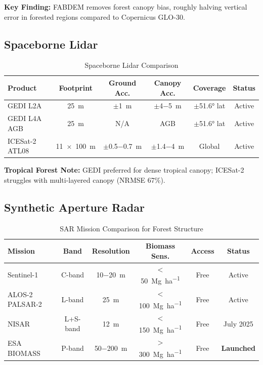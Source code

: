 \documentclass[11pt,letterpaper]{article}
\begin{document}
\textbf{Key Finding:} FABDEM removes forest canopy bias, roughly halving vertical error in forested regions compared to Copernicus GLO-30.

\subsection{Spaceborne Lidar}

\begin{table}[h]
\centering
\caption{Spaceborne Lidar Comparison}
\label{tab:lidar_comparison}
\begin{tabular}{p{2.5cm}ccccc}
\toprule
\textbf{Product} & \textbf{Footprint} & \textbf{Ground Acc.} & \textbf{Canopy Acc.} & \textbf{Coverage} & \textbf{Status} \\
\midrule
GEDI L2A & \SI{25}{m} & $\pm$\SI{1}{m} & $\pm$\SI{4-5}{m} & $\pm$\ang{51.6} lat & Active \\
GEDI L4A AGB & \SI{25}{m} & N/A & AGB & $\pm$\ang{51.6} lat & Active \\
ICESat-2 ATL08 & \SI{11 x 100}{m} & $\pm$\SI{0.5-0.7}{m} & $\pm$\SI{1.4-4}{m} & Global & Active \\
\bottomrule
\end{tabular}
\end{table}

\textbf{Tropical Forest Note:} GEDI preferred for dense tropical canopy; ICESat-2 struggles with multi-layered canopy (NRMSE 67\%).

\subsection{Synthetic Aperture Radar}

\begin{table}[h]
\centering
\caption{SAR Mission Comparison for Forest Structure}
\label{tab:sar_comparison}
\begin{tabular}{p{2.5cm}ccccc}
\toprule
\textbf{Mission} & \textbf{Band} & \textbf{Resolution} & \textbf{Biomass Sens.} & \textbf{Access} & \textbf{Status} \\
\midrule
Sentinel-1 & C-band & \SI{10-20}{m} & $<$\SI{50}{Mg~ha^{-1}} & Free & Active \\
ALOS-2 PALSAR-2 & L-band & \SI{25}{m} & $<$\SI{100}{Mg~ha^{-1}} & Free & Active \\
\rowcolor{inprogress!30}
NISAR & L+S-band & \SI{12}{m} & $<$\SI{150}{Mg~ha^{-1}} & Free & July 2025 \\
\rowcolor{complete!30}
ESA BIOMASS & P-band & \SI{50-200}{m} & $>$\SI{300}{Mg~ha^{-1}} & Free & \textbf{Launched} \\
\bottomrule
\end{tabular}
\end{table}
\end{document}
